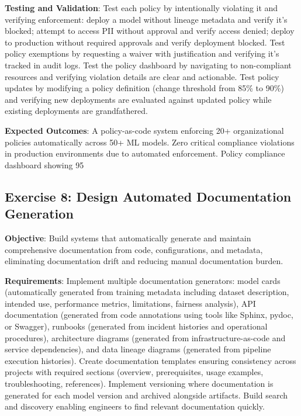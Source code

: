\textbf{Testing and Validation}: Test each policy by intentionally violating it and verifying enforcement: deploy a model without lineage metadata and verify it's blocked; attempt to access PII without approval and verify access denied; deploy to production without required approvals and verify deployment blocked. Test policy exemptions by requesting a waiver with justification and verifying it's tracked in audit logs. Test the policy dashboard by navigating to non-compliant resources and verifying violation details are clear and actionable. Test policy updates by modifying a policy definition (change threshold from 85\% to 90\%) and verifying new deployments are evaluated against updated policy while existing deployments are grandfathered.

\textbf{Expected Outcomes}: A policy-as-code system enforcing 20+ organizational policies automatically across 50+ ML models. Zero critical compliance violations in production environments due to automated enforcement. Policy compliance dashboard showing 95%

\subsection{Exercise 8: Design Automated Documentation Generation}

\textbf{Objective}: Build systems that automatically generate and maintain comprehensive documentation from code, configurations, and metadata, eliminating documentation drift and reducing manual documentation burden.

\textbf{Requirements}: Implement multiple documentation generators: model cards (automatically generated from training metadata including dataset description, intended use, performance metrics, limitations, fairness analysis), API documentation (generated from code annotations using tools like Sphinx, pydoc, or Swagger), runbooks (generated from incident histories and operational procedures), architecture diagrams (generated from infrastructure-as-code and service dependencies), and data lineage diagrams (generated from pipeline execution histories). Create documentation templates ensuring consistency across projects with required sections (overview, prerequisites, usage examples, troubleshooting, references). Implement versioning where documentation is generated for each model version and archived alongside artifacts. Build search and discovery enabling engineers to find relevant documentation quickly.

